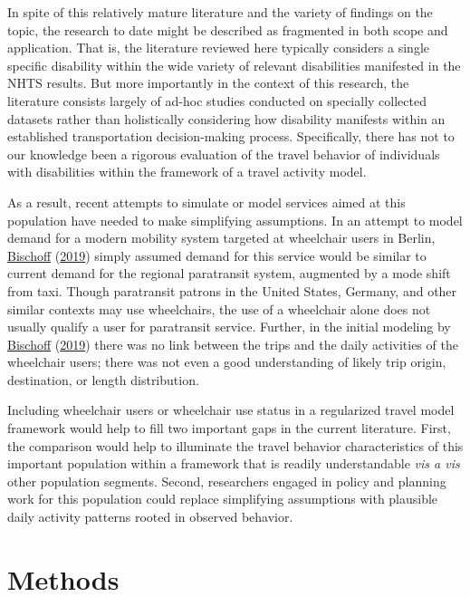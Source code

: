 \documentclass[3p, authoryear, review]{elsarticle} %
\begin{document}
In spite of this relatively mature literature and the variety of findings on the
topic, the research to date might be described as fragmented in both scope and
application. That is, the literature reviewed here typically considers a single
specific disability within the wide variety of relevant disabilities manifested
in the NHTS results. But more importantly in the context of this research, the
literature consists largely of ad-hoc studies conducted on specially
collected datasets rather than holistically considering how disability manifests
within an established transportation decision-making process. Specifically,
there has not to our knowledge been a rigorous evaluation of the travel behavior
of individuals with disabilities within the framework of a travel activity
model.

As a result, recent attempts to simulate or model services aimed at this
population have needed to make simplifying assumptions. In an attempt to model
demand for a modern mobility system targeted at wheelchair users in Berlin,
\protect\hyperlink{ref-Bischoff2019}{Bischoff} (\protect\hyperlink{ref-Bischoff2019}{2019}) simply assumed demand for this service would be similar to current
demand for the regional paratransit system, augmented by a mode shift from taxi.
Though paratransit patrons in the United States, Germany, and other similar
contexts may use wheelchairs, the use of a wheelchair alone does not usually
qualify a user for paratransit service.
Further, in the initial modeling by \protect\hyperlink{ref-Bischoff2019}{Bischoff} (\protect\hyperlink{ref-Bischoff2019}{2019}) there was no link between the
trips and the daily activities of the wheelchair users; there was not even a
good understanding of likely trip origin, destination, or length distribution.

Including wheelchair users or wheelchair use status in a regularized travel model
framework would help to fill two important gaps in the current literature. First,
the comparison would help to illuminate the travel behavior characteristics of
this important population within a framework that is readily understandable
\emph{vis a vis} other population segments. Second, researchers engaged in
policy and planning work for this population could replace simplifying assumptions
with plausible daily activity patterns rooted in observed behavior.

\hypertarget{methodology}{%
\section{Methods}\label{methodology}}
\end{document}
